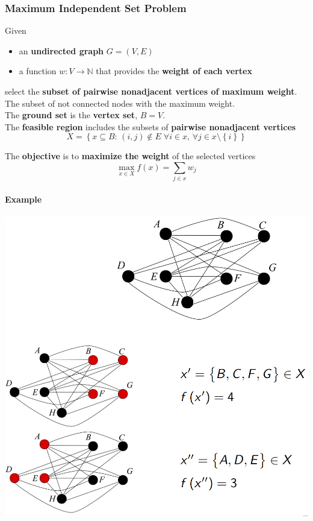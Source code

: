 \documentclass[11pt]{article}
\begin{document}
	\newpage
	
	\subsubsection{Maximum Independent Set Problem}
	Given
	\begin{itemize}
		\item an \textbf{undirected graph} $G = (V , E )$
		\item a function $w : V \rightarrow \mathbb{N}$ that provides the \textbf{weight of each vertex}
	\end{itemize}
	select the \textbf{subset of pairwise nonadjacent vertices of maximum weight}.\\
	The subset of not connected nodes with the maximum weight.\\
	
	The \textbf{ground set} is the \textbf{vertex set}, $B = V$.\\
	
	The \textbf{feasible region} includes the subsets of \textbf{pairwise nonadjacent vertices}
	$$ X = \left\{x \subseteq B : \, (i,j) \notin E \; \forall i \in x, \, \forall j \in x \setminus \left\{i\right\}\right\}$$
	
	The \textbf{objective} is to \textbf{maximize the weight} of the selected vertices
	$$ \max_{x \in X} f(x) = \sum_{j \in x} w_j $$
	
	\newpage
	
	\paragraph{Example}
	\begin{center}
		\includegraphics[width=\columnwidth]{img/MISP1}
	\end{center}
	
\end{document}
